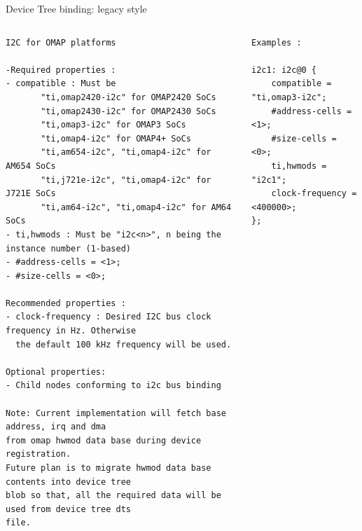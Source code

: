 \begin{frame}[fragile]{Device Tree binding: legacy style}
  \begin{center}
  \end{center}
  \begin{columns}[t]
    \begin{block}{}
      {\fontsize{5}{6}\selectfont
\begin{verbatim}
I2C for OMAP platforms

-Required properties :
- compatible : Must be
       "ti,omap2420-i2c" for OMAP2420 SoCs
       "ti,omap2430-i2c" for OMAP2430 SoCs
       "ti,omap3-i2c" for OMAP3 SoCs
       "ti,omap4-i2c" for OMAP4+ SoCs
       "ti,am654-i2c", "ti,omap4-i2c" for AM654 SoCs
       "ti,j721e-i2c", "ti,omap4-i2c" for J721E SoCs
       "ti,am64-i2c", "ti,omap4-i2c" for AM64 SoCs
- ti,hwmods : Must be "i2c<n>", n being the instance number (1-based)
- #address-cells = <1>;
- #size-cells = <0>;

Recommended properties :
- clock-frequency : Desired I2C bus clock frequency in Hz. Otherwise
  the default 100 kHz frequency will be used.

Optional properties:
- Child nodes conforming to i2c bus binding

Note: Current implementation will fetch base address, irq and dma
from omap hwmod data base during device registration.
Future plan is to migrate hwmod data base contents into device tree
blob so that, all the required data will be used from device tree dts
file.
\end{verbatim}
      }
    \end{block}
    \begin{block}{}
      {\fontsize{4}{5}\selectfont
\begin{verbatim}
Examples :

i2c1: i2c@0 {
    compatible = "ti,omap3-i2c";
    #address-cells = <1>;
    #size-cells = <0>;
    ti,hwmods = "i2c1";
    clock-frequency = <400000>;
};
\end{verbatim}
      }
    \end{block}
  \end{columns}

\end{frame}

